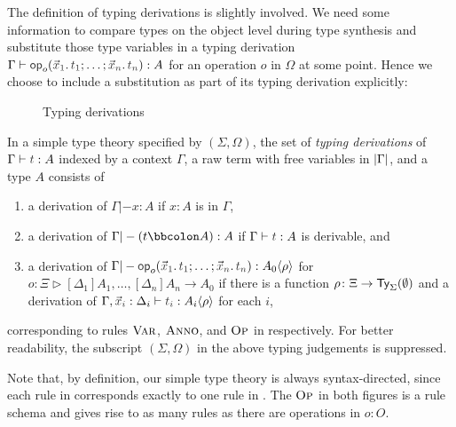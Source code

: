 The definition of typing derivations is slightly involved.
We need some information to compare types on the object level during type synthesis and substitute those type variables in a typing derivation $\Gamma \vdash \tmOpts : A$ for an operation $o$ in $\Omega$ at some point.
Hence we choose to include a substitution as part of its typing derivation explicitly:
\begin{definition}\label{def:typing-derivations}
  \begin{figure}
    \centering
    \small
    \caption{Typing derivations}
    \label{fig:extrinsic-typing}
  \end{figure}
  In a simple type theory specified by $(\Sigma, \Omega)$, the set of \emph{typing derivations} of $\Gamma \vdash \isTerm{t} : A$ indexed by a context $\Gamma$, a raw term with free variables in $\left|\Gamma\right|$, and a type $A$ consists of 
  \begin{enumerate}
    \item a derivation of $\Gamma |- x : A$ if $x : A$ is in $\Gamma$,
    \item a derivation of $\Gamma |- (t \annotate A) : A$ if $\Gamma \vdash \isTerm{t} : A$ is derivable, and
    \item a derivation of $\Gamma |- \tmOpts : \simsub{A_0}{\rho}$ for $o \colon \Xi \rhd [\Delta_1]A_1, \ldots, [\Delta_{n}]A_{n} \to A_0$ if there is a function $\rho\colon \Xi \to \mathsf{Ty}_{\Sigma}(\emptyset)$ and a derivation of $\Gamma, \vars{x}_{\isTerm{i}} : \Delta_i \vdash \isTerm{t_i} : \simsub{A_i}{\rho}$ for each $i$,
  \end{enumerate}
  corresponding to rules $\textnormal{\textsc{Var}}$, $\textnormal{\textsc{Anno}}$, and $\textnormal{\textsc{Op}}$ in  respectively.
  For better readability, the subscript $(\Sigma, \Omega)$ in the above typing judgements is suppressed.
\end{definition}
Note that, by definition, our simple type theory is always syntax-directed, since each rule in  corresponds exactly to one rule in . 
The $\textnormal{\textsc{Op}}$ in both figures is a rule schema and gives rise to as many rules as there are operations in $o : O$.

